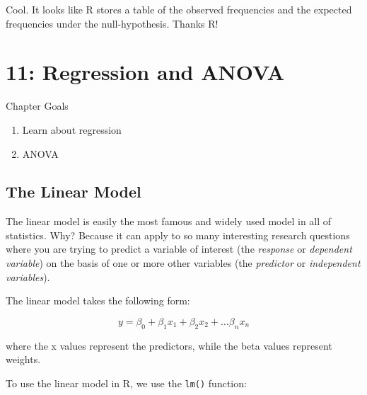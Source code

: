 \documentclass{tufte-book}\usepackage[]{graphicx}\usepackage[]{color}
\newcommand{\newfun}[1]{\begin{LARGE} \begin{center} \texttt{#1} \end{center} \end{LARGE}}
\begin{document}
\begin{footnotesize}
Cool. It looks like R stores a table of the observed frequencies and the expected frequencies under the null-hypothesis. Thanks R!





\chapter{11: Regression and ANOVA}
\label{ch:11}


Chapter Goals

\begin{enumerate}
  \item Learn about regression
  \item ANOVA
\end{enumerate}

\section{The Linear Model}

The linear model is easily the most famous and widely used model in all of statistics. Why? Because it can apply to so many interesting research questions where you are trying to predict a variable of interest (the \textit{response} or \textit{dependent variable}) on the basis of one or more other variables (the \textit{predictor} or \textit{independent variables}).

The linear model takes the following form:

\begin{Large}
\begin{equation*}
y=\beta_{0}+\beta_{1}x_{1}+\beta_{2}x_{2}+...\beta_{n}x_{n}
\end{equation*}
\end{Large}

where the x values represent the predictors, while the beta values represent weights.

To use the linear model in R, we use the \texttt{lm()} function:





\vspace{5mm} %
\noindent
\setlength{\fboxrule}{1.5pt}
\fbox{
\parbox{\textwidth}{

\newfun{lm()}\index{lm()}

}}
\end{footnotesize}
\end{document}
